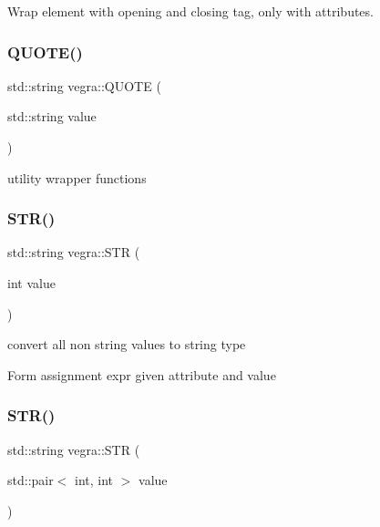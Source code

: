 Wrap element with opening and closing tag, only with attributes. 

\mbox{\label{namespacevegra_a35980cba2dab0fb1d1e3154dfa23cbfc}} 
\subsubsection{\texorpdfstring{Q\+U\+O\+T\+E()}{QUOTE()}}
{\footnotesize\ttfamily std\+::string vegra\+::\+Q\+U\+O\+TE (\begin{DoxyParamCaption}\item[{std\+::string}]{value }\end{DoxyParamCaption})\hspace{0.3cm}{\ttfamily [inline]}}



utility wrapper functions 

\mbox{\label{namespacevegra_ac0412cf8d762772ec0857239d5d47eb3}} 
\subsubsection{\texorpdfstring{S\+T\+R()}{STR()}\hspace{0.1cm}{\footnotesize\ttfamily [1/2]}}
{\footnotesize\ttfamily std\+::string vegra\+::\+S\+TR (\begin{DoxyParamCaption}\item[{int}]{value }\end{DoxyParamCaption})\hspace{0.3cm}{\ttfamily [inline]}}



convert all non string values to string type 

Form assignment expr given attribute and value \mbox{\label{namespacevegra_a5365ef337b0b536116d63a2352fd903d}} 
\subsubsection{\texorpdfstring{S\+T\+R()}{STR()}\hspace{0.1cm}{\footnotesize\ttfamily [2/2]}}
{\footnotesize\ttfamily std\+::string vegra\+::\+S\+TR (\begin{DoxyParamCaption}\item[{std\+::pair$<$ int, int $>$}]{value }\end{DoxyParamCaption})\hspace{0.3cm}{\ttfamily [inline]}}

